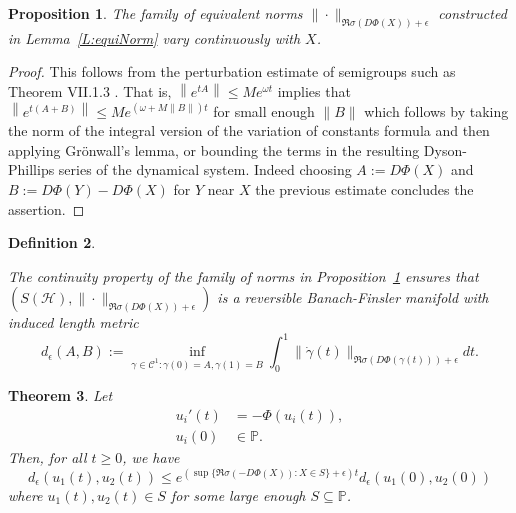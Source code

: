 \documentclass[12pt,reqno]{amsart}
\newtheorem{theorem}{Theorem}[section]
\newtheorem{proposition}[theorem]{Proposition}
\newtheorem{Definition}[theorem]{Definition}
\newenvironment{definition}{\begin{Definition}\begin{em}}{\end{em}\end{Definition}}
\begin{document}
\begin{proposition}\label{P:contiNorm}
The family of equivalent norms $\|\cdot\|_{\Re\sigma(D\Phi(X))+\epsilon}$ constructed in Lemma~\ref{L:equiNorm} vary continuously with $X$.
\end{proposition}

\begin{proof}
This follows from the perturbation estimate of semigroups such as Theorem VII.1.3 \cite{DaleckiiKrein}. That is, $\left\|e^{tA}\right\|\leq Me^{\omega t}$ implies that $\left\|e^{t(A+B)}\right\|\leq Me^{(\omega+M\|B\|)t}$ for small enough $\|B\|$ which follows by taking the norm of the integral version of the variation of constants formula and then applying Gr\"onwall's lemma, or bounding the terms in the resulting Dyson-Phillips series of the dynamical system. Indeed choosing $A:=D\Phi(X)$ and $B:=D\Phi(Y)-D\Phi(X)$ for $Y$ near $X$ the previous estimate concludes the assertion.
\end{proof}

\begin{definition}[The induced length metric $d_\epsilon$]
The continuity property of the family of norms in Proposition~\ref{P:contiNorm} ensures that $(S(\mathcal{H}),\|\cdot\|_{\Re\sigma(D\Phi(X))+\epsilon})$ is a reversible Banach-Finsler manifold with induced length metric
\begin{equation*}
d_\epsilon(A,B):=\inf_{\gamma\in\mathcal{C}^1:\gamma(0)=A, \gamma(1)=B}\int_0^1\|\dot{\gamma}(t)\|_{\Re\sigma(D\Phi(\gamma(t)))+\epsilon}dt.
\end{equation*}
\end{definition}

\begin{theorem}\label{T:contractionBanachFinsler}
Let
\begin{align*}
    u_i'(t) &= - \Phi(u_i(t)), \\
    u_i(0) &\in\mathbb{P}.
\end{align*}
Then, for all $t \geq 0$, we have
\begin{equation}\label{eq1:T:contractionBanachFinsler}
d_\epsilon(u_1(t), u_2(t)) \leq e^{(\sup\{\Re\sigma(-D\Phi(X)):X\in S\}+\epsilon) t} d_\epsilon(u_1(0), u_2(0))
\end{equation}
where $u_1(t), u_2(t)\in S$ for some large enough $S\subseteq\mathbb{P}$.
\end{theorem}
\end{document}
